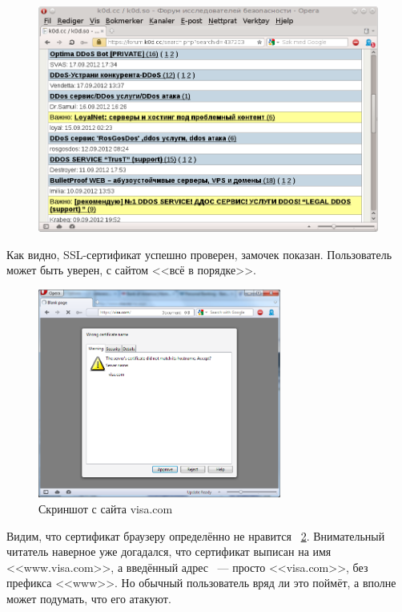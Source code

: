 \documentclass[10pt, a5paper]{article}
\begin{document}
\begin{center}

\begin{figure}[!h]
  \centering
  \includegraphics[width=12cm]{Hlebnikov2.png}

  \label{Hlebnikov2}
\end{figure}

\end{center}

Как видно, SSL-сертификат успешно проверен, замочек показан.
Пользователь может быть уверен, с сайтом <<всё в порядке>>.


\begin{center}
\begin{figure}[!h]
  \centering
  \includegraphics[width=8cm]{Hlebnikov3.png}
  \caption{Скриншот с сайта visa.com}
  \label{Hlebnikov3}
\end{figure}
\end{center}

Видим, что сертификат браузеру определённо не нравится ~\ref{Hlebnikov3}. Внимательный
читатель наверное уже догадался, что сертификат выписан на имя
<<www.visa.com>>, а введённый адрес ~--- просто <<visa.com>>, без префикса
<<www>>. Но обычный пользователь вряд ли это поймёт, а вполне может
подумать, что его атакуют.
\end{document}
